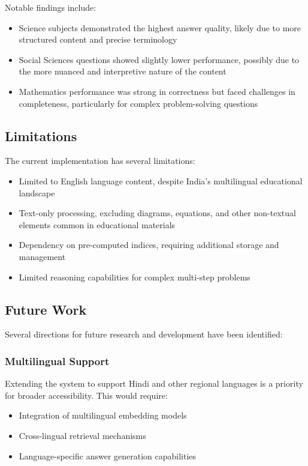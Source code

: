 \documentclass[10pt,conference]{IEEEtran}
\begin{document}
Notable findings include:
\begin{itemize}
    \item Science subjects demonstrated the highest answer quality, likely due to more structured content and precise terminology
    \item Social Sciences questions showed slightly lower performance, possibly due to the more nuanced and interpretive nature of the content
    \item Mathematics performance was strong in correctness but faced challenges in completeness, particularly for complex problem-solving questions
\end{itemize}

\subsection{Limitations}
The current implementation has several limitations:
\begin{itemize}
    \item Limited to English language content, despite India's multilingual educational landscape
    \item Text-only processing, excluding diagrams, equations, and other non-textual elements common in educational materials
    \item Dependency on pre-computed indices, requiring additional storage and management
    \item Limited reasoning capabilities for complex multi-step problems
\end{itemize}

\subsection{Future Work}
Several directions for future research and development have been identified:

\subsubsection{Multilingual Support}
Extending the system to support Hindi and other regional languages is a priority for broader accessibility. This would require:
\begin{itemize}
    \item Integration of multilingual embedding models
    \item Cross-lingual retrieval mechanisms
    \item Language-specific answer generation capabilities
\end{itemize}
\end{document}
